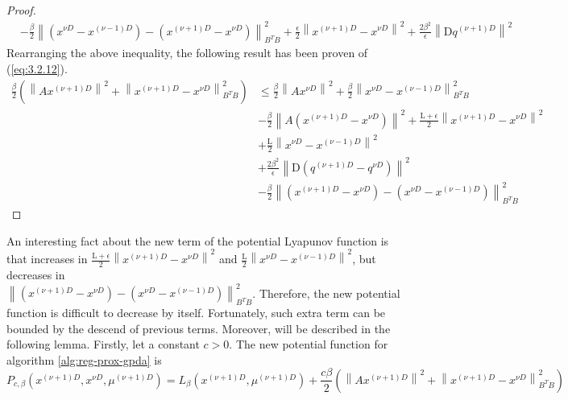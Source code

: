 \begin{proof}
\begin{equation*}
\begin{align}
                 &- \frac{\beta}{2}\left \lVert(x^{\nu D} - x^{(\nu - 1)D}) - (x^{(\nu + 1)D} - x^{\nu D})\right \rVert^2_{B^TB} + \frac{\epsilon}{2}\left \lVert x^{(\nu + 1)D} - x^{\nu D} \right \rVert ^2 + \frac{2 \beta^2}{\epsilon} \left \lVert \mathrm{D}q^{(\nu + 1)D} \right \rVert ^2
            \end{align}
        \end{equation*}
        Rearranging the above inequality, the following result has been proven of (\ref{eq:3.2.12}).
        \begin{equation*}
            \begin{align*}
                \frac{\beta}{2}\left(\left \lVert Ax^{(\nu + 1)D}\right \rVert^2 + \left \lVert x^{(\nu + 1)D} - x^{\nu D} \right \rVert^2_{B^TB} \right) &\leq \frac{\beta}{2} \left \lVert Ax^{\nu D}\right \rVert^2 + \frac{\beta}{2}\left \lVert x^{\nu D} - x^{(\nu - 1)D} \right \rVert^2_{B^TB}\\ &- \frac{\beta}{2}\left \lVert A\left(x^{(\nu + 1)D} - x^{\nu D}\right)\right \rVert^2 
                + \frac{\mathrm{L} + \epsilon}{2}\left \lVert x^{(\nu + 1)D} - x^{\nu D} \right \rVert^2\\& + \frac{\mathrm{L}}{2}\left \lVert x^{\nu D} - x^{(\nu - 1)D} \right \rVert^2 \\ &+ \frac{2 \beta^2}{\epsilon}\left \lVert \mathrm{D}\left(q^{(\nu + 1)D} - q^{\nu D}\right) \right \rVert^2\\
                &- \frac{\beta}{2}\left \lVert \left(x^{(\nu + 1)D} -x^{\nu D}\right) - \left( x^{\nu D} - x^{(\nu - 1)D} \right)  \right \rVert^2_{B^TB}
            \end{align*}
        \end{equation*}
    \end{proof}
    
    An interesting fact about the new term of the potential Lyapunov function is that increases in $\frac{\mathrm{L} + \epsilon}{2}\left \lVert x^{(\nu + 1)D} - x^{\nu D} \right \rVert^2$ and $\frac{\mathrm{L}}{2}\left \lVert x^{\nu D} - x^{(\nu - 1)D} \right \rVert^2$, but decreases in\\ $\left \lVert \left(x^{(\nu + 1)D} -x^{\nu D}\right) - \left( x^{\nu D} - x^{(\nu - 1)D} \right)  \right \rVert^2_{B^TB}$. Therefore, the new potential function is difficult to decrease by itself. Fortunately, such extra term can be bounded by the descend of previous terms. Moreover, will be described in the following lemma. Firstly, let a constant $c > 0$. The new potential function for algorithm \ref{alg:reg-prox-gpda} is 
    \begin{equation}\label{eq:3.2.16}
        P_{c, \beta} \left(x^{(\nu + 1)D}, x^{\nu D}, \mu^{(\nu + 1)D}\right) = L_{\beta} \left(x^{(\nu + 1)D}, \mu^{(\nu + 1)D}\right) + \frac{c\beta}{2}\left( \left \lVert Ax^{(\nu + 1)D}\right \rVert^2 + \left \lVert x^{(\nu + 1)D} - x^{\nu D} \right \rVert^2_{B^TB} \right)
    \end{equation}

